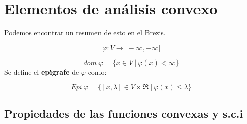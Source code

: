 %
%
%

\chapter{Elementos de an\'alisis convexo}

Podemos encontrar un resumen de esto en el Brezis.

\begin{displaymath}
\varphi : V \longrightarrow ]-\infty ,+\infty ]
\end{displaymath}

\begin{displaymath}
dom \ \varphi =\{x\in V\ | \ \varphi (x) < \infty \}
\end{displaymath}
Se define el \textbf{ep\'{\i}grafe} de $\varphi$ como:

\begin{displaymath}
Epi\ \varphi = \{[x,\lambda ] \in V\times \Re \ |\ \varphi(x)\le \lambda \}
\end{displaymath}

\section{Propiedades de las funciones convexas y s.c.i}

